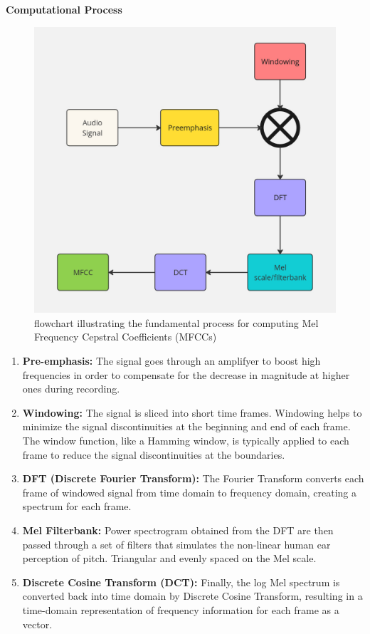 \textbf{Computational Process} \cite{gupta_feature_2013, zater_feature_2022}

\begin{figure}
    \centering
    \includegraphics[width=0.5\linewidth]{images/mfcc_Flowchart.jpg}
    \caption{flowchart illustrating the fundamental process for computing Mel Frequency Cepstral Coefficients (MFCCs)}
    \label{fig:enter-label}
\end{figure}

\begin{enumerate}
    \item \textbf{Pre-emphasis:}
    The signal goes through an amplifyer to boost high frequencies in order to compensate for the decrease in magnitude at higher ones during recording.

    \item \textbf{Windowing:}
    The signal is sliced into short time frames. Windowing helps to minimize the signal discontinuities at the beginning and end of each frame. The window function, like a Hamming window, is typically applied to each frame to reduce the signal discontinuities at the boundaries.

    \item \textbf{DFT (Discrete Fourier Transform):}
    The Fourier Transform converts each frame of windowed signal from time domain to frequency domain, creating a spectrum for each frame.

    \item \textbf{Mel Filterbank:}
    Power spectrogram obtained from the DFT are then passed through a set of filters that simulates the non-linear human ear perception of pitch. Triangular and evenly spaced on the Mel scale.

    \item \textbf{Discrete Cosine Transform (DCT):}
    Finally, the log Mel spectrum is converted back into time domain by Discrete Cosine Transform, resulting in a time-domain representation of frequency information for each frame as a vector.
\end{enumerate}



